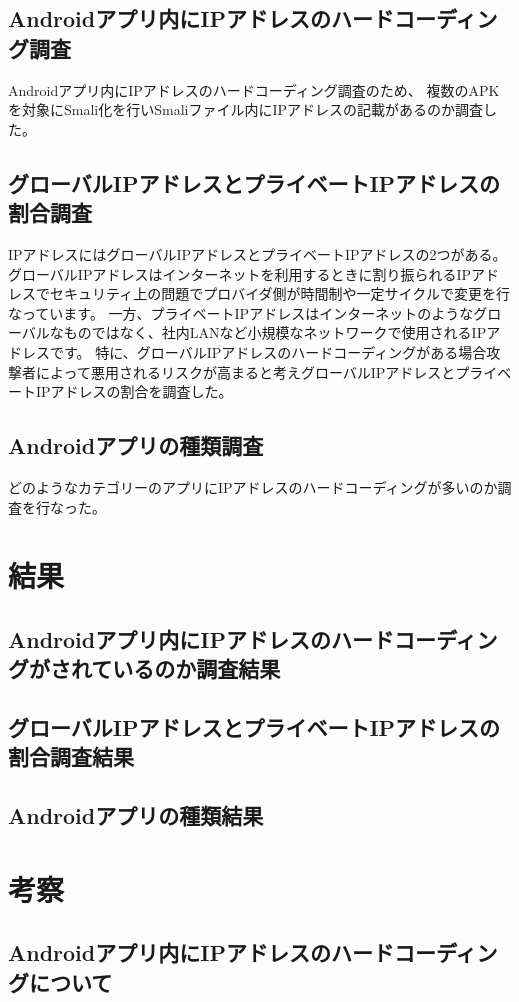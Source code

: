 \documentclass[a4j]{jarticle}
\begin{document}
\subsection{Androidアプリ内にIPアドレスのハードコーディング調査}
Androidアプリ内にIPアドレスのハードコーディング調査のため、
複数のAPKを対象にSmali化を行いSmaliファイル内にIPアドレスの記載があるのか調査した。
\subsection{グローバルIPアドレスとプライベートIPアドレスの割合調査}
IPアドレスにはグローバルIPアドレスとプライベートIPアドレスの2つがある。
グローバルIPアドレスはインターネットを利用するときに割り振られるIPアドレスでセキュリティ上の問題でプロバイダ側が時間制や一定サイクルで変更を行なっています。
一方、プライベートIPアドレスはインターネットのようなグローバルなものではなく、社内LANなど小規模なネットワークで使用されるIPアドレスです。
特に、グローバルIPアドレスのハードコーディングがある場合攻撃者によって悪用されるリスクが高まると考えグローバルIPアドレスとプライベートIPアドレスの割合を調査した。
\subsection{Androidアプリの種類調査}
どのようなカテゴリーのアプリにIPアドレスのハードコーディングが多いのか調査を行なった。
\newpage
\section{結果}
\subsection{Androidアプリ内にIPアドレスのハードコーディングがされているのか調査結果}
\subsection{グローバルIPアドレスとプライベートIPアドレスの割合調査結果}
\subsection{Androidアプリの種類結果}


\newpage
\section{考察}
\subsection{Androidアプリ内にIPアドレスのハードコーディングについて}
\end{document}
